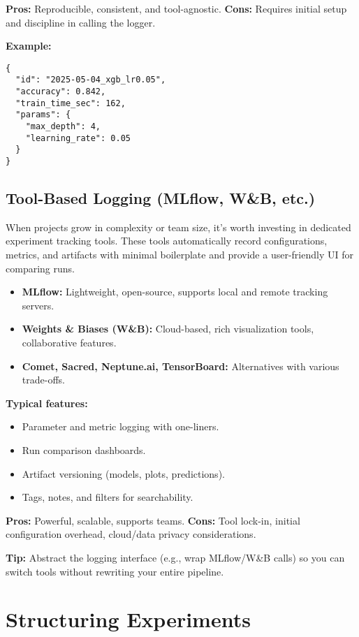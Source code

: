 \documentclass[12pt,openany]{book}
\begin{document}
\textbf{Pros:} Reproducible, consistent, and tool-agnostic.  
\textbf{Cons:} Requires initial setup and discipline in calling the logger.

\textbf{Example:}
\begin{verbatim}
{
  "id": "2025-05-04_xgb_lr0.05",
  "accuracy": 0.842,
  "train_time_sec": 162,
  "params": {
    "max_depth": 4,
    "learning_rate": 0.05
  }
}
\end{verbatim}

\subsection{Tool-Based Logging (MLflow, W\&B, etc.)}

When projects grow in complexity or team size, it's worth investing in dedicated experiment tracking tools. These tools automatically record configurations, metrics, and artifacts with minimal boilerplate and provide a user-friendly UI for comparing runs.

\begin{itemize}
    \item \textbf{MLflow:} Lightweight, open-source, supports local and remote tracking servers.
    \item \textbf{Weights \& Biases (W\&B):} Cloud-based, rich visualization tools, collaborative features.
    \item \textbf{Comet, Sacred, Neptune.ai, TensorBoard:} Alternatives with various trade-offs.
\end{itemize}

\textbf{Typical features:}
\begin{itemize}
    \item Parameter and metric logging with one-liners.
    \item Run comparison dashboards.
    \item Artifact versioning (models, plots, predictions).
    \item Tags, notes, and filters for searchability.
\end{itemize}

\textbf{Pros:} Powerful, scalable, supports teams.  
\textbf{Cons:} Tool lock-in, initial configuration overhead, cloud/data privacy considerations.

\textbf{Tip:} Abstract the logging interface (e.g., wrap MLflow/W\&B calls) so you can switch tools without rewriting your entire pipeline.



\section{Structuring Experiments}
\end{document}
